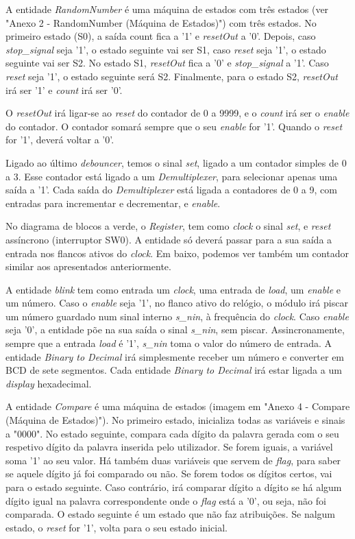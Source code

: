 \documentclass[11pt,openany,twoside]{report}
\begin{document}
A entidade \textit{RandomNumber} é uma máquina de estados com três estados (ver "Anexo 2 - RandomNumber (Máquina de Estados)") com três estados. No primeiro estado (S0), a saída count fica a '1' e \textit{resetOut} a '0'. Depois, caso \textit{stop\_signal} seja '1', o estado seguinte vai ser S1, caso \textit{reset} seja '1', o estado seguinte vai ser S2. No estado S1, \textit{resetOut} fica a '0' e \textit{stop\_signal} a '1'. Caso \textit{reset} seja '1', o estado seguinte será S2. Finalmente, para o estado S2, \textit{resetOut} irá ser '1' e \textit{count} irá ser '0'. 

O \textit{resetOut} irá ligar-se ao \textit{reset} do contador de 0 a 9999, e o \textit{count} irá ser o \textit{enable} do contador. O contador somará sempre que o seu \textit{enable} for '1'. Quando o \textit{reset} for '1', deverá voltar a '0'.

Ligado ao último \textit{debouncer}, temos o sinal \textit{set}, ligado a um contador simples de 0 a 3. Esse contador está ligado a um \textit{Demultiplexer}, para selecionar apenas uma saída a '1'. Cada saída do \textit{Demultiplexer} está ligada a contadores de 0 a 9, com entradas para incrementar e decrementar, e \textit{enable}.

No diagrama de blocos a verde, o \textit{Register}, tem como \textit{clock} o sinal \textit{set}, e \textit{reset} assíncrono (interruptor SW0). A entidade só deverá passar para a sua saída a entrada nos flancos ativos do \textit{clock}. Em baixo, podemos ver também um contador similar aos apresentados anteriormente.

A entidade \textit{blink} tem como entrada um \textit{clock}, uma entrada de \textit{load}, um \textit{enable} e um número. Caso o \textit{enable} seja '1', no flanco ativo do relógio, o módulo irá piscar um número guardado num sinal interno \textit{s\_nin}, à frequência do \textit{clock}. Caso \textit{enable} seja '0', a entidade põe na sua saída o sinal \textit{s\_nin}, sem piscar. Assincronamente, sempre que a entrada \textit{load} é '1', \textit{s\_nin} toma o valor do número de entrada. A entidade \textit{Binary to Decimal} irá simplesmente receber um número e converter em BCD de sete segmentos. Cada entidade \textit{Binary to Decimal} irá estar ligada a um \textit{display} hexadecimal.

A entidade \textit{Compare} é uma máquina de estados (imagem em "Anexo 4 - Compare (Máquina de Estados)"). No primeiro estado, inicializa todas as variáveis e sinais a "0000". No estado seguinte, compara cada dígito da palavra gerada com o seu respetivo dígito da palavra inserida pelo utilizador. Se forem iguais, a variável soma '1' ao seu valor. Há também duas variáveis que servem de \textit{flag}, para saber se aquele dígito já foi comparado ou não. Se forem todos os dígitos certos, vai para o estado seguinte. Caso contrário, irá comparar dígito a dígito se há algum dígito igual na palavra correspondente onde o \textit{flag} está a '0', ou seja, não foi comparada. O estado seguinte é um estado que não faz atribuições. Se nalgum estado, o \textit{reset} for '1', volta para o seu estado inicial.
\end{document}
